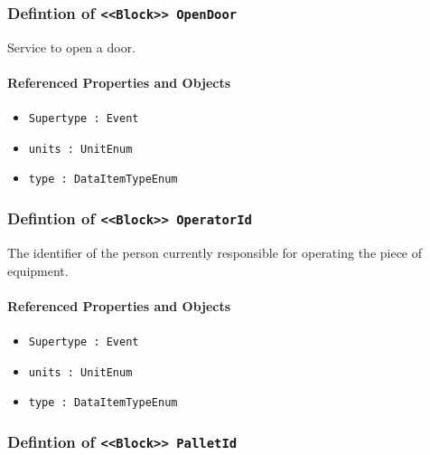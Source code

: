 \subsubsection{Defintion of \texttt{<<Block>> OpenDoor}}
  \label{type:OpenDoor}

\FloatBarrier

Service to open a door.

\FloatBarrier
\paragraph{Referenced Properties and Objects}

\begin{itemize}
\item \texttt{Supertype : Event}

\item \texttt{units : UnitEnum}

\item \texttt{type : DataItemTypeEnum}

\end{itemize}
\FloatBarrier
\subsubsection{Defintion of \texttt{<<Block>> OperatorId}}
  \label{type:OperatorId}

\FloatBarrier

The identifier of the person currently responsible for operating the piece of equipment.

\FloatBarrier
\paragraph{Referenced Properties and Objects}

\begin{itemize}
\item \texttt{Supertype : Event}

\item \texttt{units : UnitEnum}

\item \texttt{type : DataItemTypeEnum}

\end{itemize}
\FloatBarrier
\subsubsection{Defintion of \texttt{<<Block>> PalletId}}
  \label{type:PalletId}

